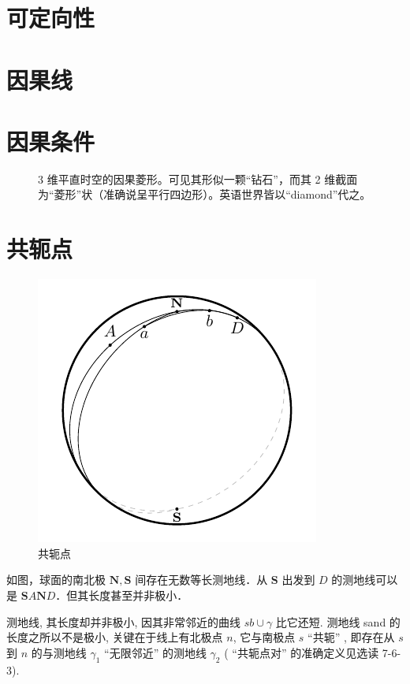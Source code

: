 \section{可定向性}

\section{因果线}

\section{因果条件}



\begin{figure}[h!]\centering
    \caption{3 维平直时空的因果菱形。可见其形似一颗“钻石”，而其 2 维截面为“菱形”状（准确说呈平行四边形）。英语世界皆以“diamond”代之。}
\end{figure}


\section{共轭点}

\begin{figure}
    \centering
    \includegraphics[width=.3\textwidth]{fig/chpt01/sphere.pdf}
    \caption{共轭点}
\end{figure}

如图，球面的南北极 $\mathbf N,\mathbf S$ 间存在无数等长测地线．从 $\mathbf S$ 出发到 $D$ 的测地线可以是 $\mathbf S A \mathbf N D$．但其长度甚至并非极小．


测地线, 其长度却并非极小, 因其非常邻近的曲线 $s b \cup \gamma$ 比它还短. 测地线 sand 的长度之所以不是极小, 关键在于线上有北极点 $n$, 它与南极点 $s$ “共轭” , 即存在从 $s$ 到 $n$ 的与测地线 $\gamma_1$ “无限邻近” 的测地线 $\gamma_2$ ( “共轭点对” 的准确定义见选读 7-6-3). 

